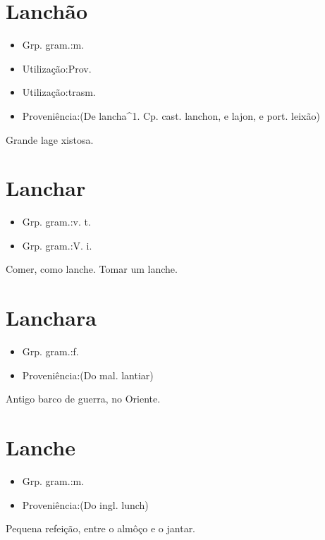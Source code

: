 \section{Lanchão}
\begin{itemize}
\item {Grp. gram.:m.}
\end{itemize}
\begin{itemize}
\item {Utilização:Prov.}
\end{itemize}
\begin{itemize}
\item {Utilização:trasm.}
\end{itemize}
\begin{itemize}
\item {Proveniência:(De \textunderscore lancha\textunderscore ^1. Cp. cast. \textunderscore lanchon\textunderscore , e \textunderscore lajon\textunderscore , e port. \textunderscore leixão\textunderscore )}
\end{itemize}
Grande lage xistosa.
\section{Lanchar}
\begin{itemize}
\item {Grp. gram.:v. t.}
\end{itemize}
\begin{itemize}
\item {Grp. gram.:V. i.}
\end{itemize}
Comer, como lanche.
Tomar um lanche.
\section{Lanchara}
\begin{itemize}
\item {Grp. gram.:f.}
\end{itemize}
\begin{itemize}
\item {Proveniência:(Do mal. \textunderscore lantiar\textunderscore )}
\end{itemize}
Antigo barco de guerra, no Oriente.
\section{Lanche}
\begin{itemize}
\item {Grp. gram.:m.}
\end{itemize}
\begin{itemize}
\item {Proveniência:(Do ingl. \textunderscore lunch\textunderscore )}
\end{itemize}
Pequena refeição, entre o almôço e o jantar.
